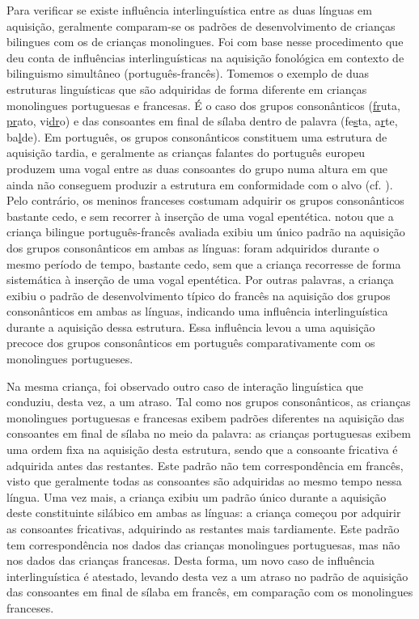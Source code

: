\documentclass[output=paper]{LSP/langsci}
\begin{document}
Para verificar se existe influência interlinguística entre as duas línguas em aquisição, geralmente comparam-se os padrões de desenvolvimento de crianças bilingues com os de crianças monolingues. Foi com base nesse procedimento que \cite{almeida2011} deu conta de influências interlinguísticas na aquisição fonológica em contexto de bilinguismo simultâneo (português-francês). Tomemos o exemplo de duas estruturas linguísticas que são adquiridas de forma diferente em crianças monolingues portuguesas e francesas. É o caso dos grupos consonânticos (\underline{fr}uta, \underline{pr}ato, vi\underline{dr}o) e das consoantes em final de sílaba dentro de palavra (fe\underline{s}ta, a\underline{r}te, ba\underline{l}de). Em português, os grupos consonânticos constituem uma estrutura de aquisição tardia, e geralmente as crianças falantes do português europeu produzem uma vogal entre as duas consoantes do grupo numa altura em que ainda não conseguem produzir a estrutura em conformidade com o alvo (cf. \citealt{freitas2017}). Pelo contrário, os meninos franceses costumam adquirir os grupos consonânticos bastante cedo, e sem recorrer à inserção de uma vogal epentética. \cite{almeida2011} notou que a criança bilingue português-francês avaliada exibiu um único padrão na aquisição dos grupos consonânticos em ambas as línguas: foram adquiridos durante o mesmo período de tempo, bastante cedo, sem que a criança recorresse de forma sistemática à inserção de uma vogal epentética. Por outras palavras, a criança exibiu o padrão de desenvolvimento típico do francês na aquisição dos grupos consonânticos em ambas as línguas, indicando uma influência interlinguística durante a aquisição dessa estrutura. Essa influência levou a uma aquisição precoce dos grupos consonânticos em português comparativamente com os monolingues portugueses. 

Na mesma criança, foi observado outro caso de interação linguística que conduziu, desta vez, a um atraso. Tal como nos grupos consonânticos, as crianças monolingues portuguesas e francesas exibem padrões diferentes na aquisição das consoantes em final de sílaba no meio da palavra: as crianças portuguesas exibem uma ordem fixa na aquisição desta estrutura, sendo que a consoante fricativa é adquirida antes das restantes. Este padrão não tem correspondência em francês, visto que geralmente todas as consoantes são adquiridas ao mesmo tempo nessa língua. Uma vez mais, a criança exibiu um padrão único durante a aquisição deste constituinte silábico em ambas as línguas: a criança começou por adquirir as consoantes fricativas, adquirindo as restantes mais tardiamente. Este padrão tem correspondência nos dados das crianças monolingues portuguesas, mas não nos dados das crianças francesas. Desta forma, um novo caso de influência interlinguística é atestado, levando desta vez a um atraso no padrão de aquisição das consoantes em final de sílaba em francês, em comparação com os monolingues franceses.
\end{document}
